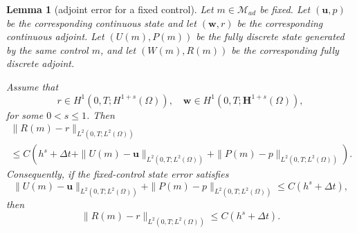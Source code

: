 \documentclass{amsart}
\newtheorem{lemma}[theorem]{Lemma}
\begin{document}

\begin{lemma}[adjoint error for a fixed control]
\label{lem:adjoint-error-fixed-control}
Let $m\in \mathcal{M}_{ad}$ be fixed. Let $(\boldsymbol{u},p)$ be the
corresponding continuous state and let $(\boldsymbol{w},r)$ be the
corresponding continuous adjoint. Let $(U(m),P(m))$ be the fully
discrete state generated by the same control $m$, and let
$(W(m),R(m))$ be the corresponding fully discrete adjoint.

Assume that
\[
 r\in H^1(0,T;H^{1+s}(\Omega)),
 \quad 
 \boldsymbol{w}\in H^1(0,T;\boldsymbol{H}^{1+s}(\Omega)),
\]
for some $0<s\le 1$. Then
%
\begin{multline}
    \|R(m)-r\|_{L^2(0,T;L^2(\Omega))} 
    \\
    \le C\left( h^s+\Delta t + \|U(m)-\boldsymbol{u}\|_{L^2(0,T;L^2(\Omega))} +\|P(m)-p\|_{L^2(0,T;L^2(\Omega))} \right).
\end{multline}
%
Consequently, if the fixed-control state error satisfies
\[
\|U(m)-\boldsymbol{u}\|_{L^2(0,T;L^2(\Omega))}
+ \|P(m)-p\|_{L^2(0,T;L^2(\Omega))} \le C(h^s+\Delta t),
\]
then
\[
\|R(m)-r\|_{L^2(0,T;L^2(\Omega))} \le C(h^s+\Delta t).
\]
\end{lemma}
\end{document}
